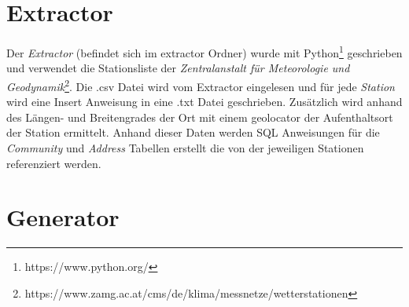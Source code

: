 \section{Extractor}
Der \textit{Extractor} (befindet sich im extractor Ordner) wurde mit Python\footnote{https://www.python.org/} geschrieben und verwendet die Stationsliste der \textit{Zentralanstalt für Meteorologie und Geodynamik}\footnote{https://www.zamg.ac.at/cms/de/klima/messnetze/wetterstationen}. Die \grqq{}.csv\grqq{} Datei wird vom Extractor eingelesen und für jede \textit{Station} wird eine Insert Anweisung in eine \grqq{}.txt\grqq{} Datei geschrieben. Zusätzlich wird anhand des Längen- und Breitengrades der Ort mit einem geolocator der Aufenthaltsort der Station ermittelt. Anhand dieser Daten werden SQL Anweisungen für die \textit{Community} und \textit{Address} Tabellen erstellt die von der jeweiligen Stationen referenziert werden.

\section{Generator}